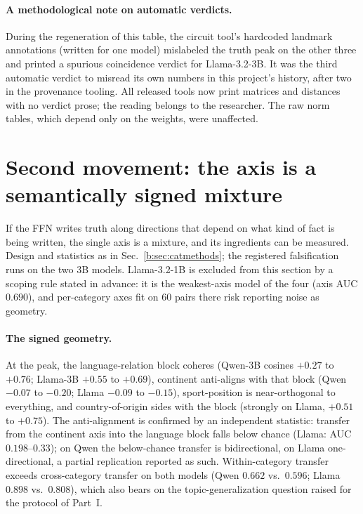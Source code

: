 \documentclass[11pt]{article}
\begin{document}
\paragraph{A methodological note on automatic verdicts.} During the
regeneration of this table, the circuit tool's hardcoded landmark
annotations (written for one model) mislabeled the truth peak on the other
three and printed a spurious coincidence verdict for Llama-3.2-3B. It was
the third automatic verdict to misread its own numbers in this project's
history, after two in the provenance tooling. All released tools now print
matrices and distances with no verdict prose; the reading belongs to the
researcher. The raw norm tables, which depend only on the weights, were
unaffected.

\section{Second movement: the axis is a semantically signed mixture}
\label{b:sec:mixture}

If the FFN writes truth along directions that depend on what kind of fact
is being written, the single axis is a mixture, and its ingredients can be
measured. Design and statistics as in Sec.~\ref{b:sec:catmethods}; the
registered falsification runs on the two 3B models. Llama-3.2-1B is
excluded from this section by a scoping rule stated in advance: it is the
weakest-axis model of the four (axis AUC $0.690$), and per-category axes
fit on $60$ pairs there risk reporting noise as geometry.

\paragraph{The signed geometry.} At the peak, the language-relation block
coheres (Qwen-3B cosines $+0.27$ to $+0.76$; Llama-3B $+0.55$ to $+0.69$),
continent anti-aligns with that block (Qwen $-0.07$ to $-0.20$; Llama
$-0.09$ to $-0.15$), sport-position is near-orthogonal to everything, and
country-of-origin sides with the block (strongly on Llama, $+0.51$ to
$+0.75$). The anti-alignment is confirmed by an independent statistic:
transfer from the continent axis into the language block falls below
chance (Llama: AUC $0.198$--$0.33$); on Qwen the below-chance transfer is
bidirectional, on Llama one-directional, a partial replication reported as
such. Within-category transfer exceeds cross-category transfer on both
models (Qwen $0.662$ vs.\ $0.596$; Llama $0.898$ vs.\ $0.808$), which also
bears on the topic-generalization question raised for the protocol of Part~I.
\end{document}

